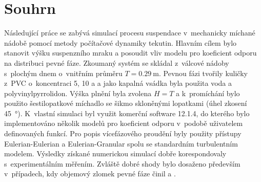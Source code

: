 \section*{Souhrn}
Následující práce se zabývá simulací procesu suspendace v~mechanicky míchané nádobě pomocí metody počítačové dynamiky tekutin. Hlavním cílem bylo stanovit výšku sus\-pen\-zní\-ho mraku a posoudit vliv modelu pro koeficient odporu na distribuci pevné fáze. Zkoumaný systém se skládal z~válcové nádoby s~plochým dnem o~vnitřním průměru $T=\SI{0.29}{\meter}$. Pevnou fázi tvořily kuličky z~PVC o~koncentraci 5, 10 a  a jako kapalná vsádka byla použita voda a polyvinylpyrrolidon. Výška plnění byla zvolena $H=T$ a k~promíchání bylo použito šestilopatkové míchadlo se šikmo skloněnými lopatkami (úhel zkosení \SI{45}{\degree}). K~vlastní simulaci byl využit komerční software \flu{} 12.1.4, do kterého bylo implementováno několik modelů pro koeficient odporu v~podobě uživatelem definovaných funkcí. Pro popis vícefázového proudění byly použity přístupy Eulerian-Eulerian a Eulerian-Granular spolu se standardním \keps{} turbulentním modelem. Výsledky získané numerickou simulací dobře korespondovaly s~experimentálním měřením. Zvláště dobré shody bylo dosaženo především v~případech, kdy objemový zlomek pevné fáze činil  a .

